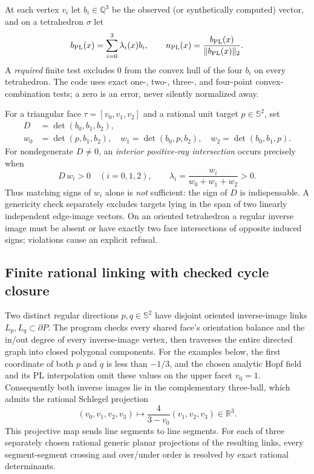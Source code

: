 \documentclass[aps,prd,onecolumn,notitlepage,11pt,superscriptaddress,longbibliography]{revtex4-2}
\newcommand{\Sph}{\mathbb S}
\begin{document}
At each vertex $v_i$ let $b_i\in\mathbb Q^3$ be the observed (or synthetically computed) vector, and on a tetrahedron $\sigma$ let
\begin{equation}
  b_{\rm PL}(x)=\sum_{i=0}^3\lambda_i(x)b_i,\qquad
  n_{\rm PL}(x)=\frac{b_{\rm PL}(x)}{\|b_{\rm PL}(x)\|_2}.
\end{equation}
A \emph{required} finite test excludes $0$ from the convex hull of the four $b_i$ on every tetrahedron. The code uses exact one-, two-, three-, and four-point convex-combination tests; a zero is an error, never silently normalized away.

For a triangular face $\tau=[v_0,v_1,v_2]$ and a rational unit target $p\in\Sph^2$, set
\begin{equation}
\begin{split}
D&=\det(b_0,b_1,b_2),\\
w_0&=\det(p,b_1,b_2),\quad
w_1=\det(b_0,p,b_2),\quad
w_2=\det(b_0,b_1,p).
\end{split}
\label{eq:v8ray}
\end{equation}
For nondegenerate $D\ne0$, an \emph{interior positive-ray intersection} occurs precisely when
\begin{equation}
\boxed{D\,w_i>0\quad(i=0,1,2),\qquad
\lambda_i=\frac{w_i}{w_0+w_1+w_2}>0.}
\label{eq:v8positive}
\end{equation}
Thus matching signs of $w_i$ alone is \emph{not} sufficient: the sign of $D$ is indispensable. A genericity check separately excludes targets lying in the span of two linearly independent edge-image vectors. On an oriented tetrahedron a regular inverse image must be absent or have exactly two face intersections of opposite induced signs; violations cause an explicit refusal.

\subsection{Finite rational linking with checked cycle closure}
Two distinct regular directions $p,q\in\Sph^2$ have disjoint oriented inverse-image links $L_p,L_q\subset\partial P$. The program checks every shared face's orientation balance and the in/out degree of every inverse-image vertex, then traverses the entire directed graph into closed polygonal components. For the examples below, the first coordinate of both $p$ and $q$ is less than $-1/3$, and the chosen analytic Hopf field and its PL interpolation omit these values on the upper facet $v_0=1$. Consequently both inverse images lie in the complementary three-ball, which admits the rational Schlegel projection
\begin{equation}
  (v_0,v_1,v_2,v_3)\mapsto
  \frac{4}{3-v_0}(v_1,v_2,v_3)\in\mathbb R^3.
\end{equation}
This projective map sends line segments to line segments. For each of three separately chosen rational generic planar projections of the resulting links, every segment-segment crossing and over/under order is resolved by exact rational determinants.
\end{document}
